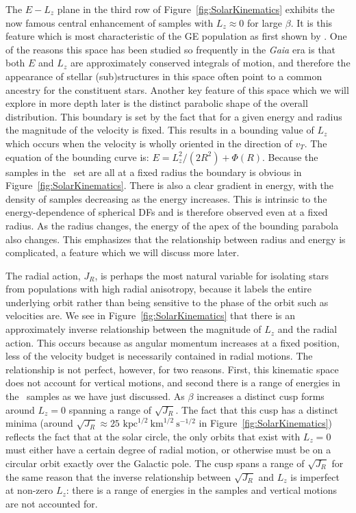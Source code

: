 The $E-L_{z}$ plane in the third row of Figure~\ref{fig:SolarKinematics} exhibits the now famous central enhancement of samples with $L_{z} \approx 0$ for large $\beta$. It is this feature which is most characteristic of the GE population as first shown by \citet{helmi18}. One of the reasons this space has been studied so frequently in the \textit{Gaia} era is that both $E$ and $L_{z}$ are approximately conserved integrals of motion, and therefore the appearance of stellar (sub)structures in this space often point to a common ancestry for the constituent stars. Another key feature of this space which we will explore in more depth later is the distinct parabolic shape of the overall distribution. This boundary is set by the fact that for a given energy and radius the magnitude of the velocity is fixed. This results in a bounding value of $L_{z}$ which occurs when the velocity is wholly oriented in the direction of $v_{T}$. The equation of the bounding curve is: $E = L_{z}^{2}/(2R^{2}) + \Phi(R)$. Because the samples in the \solar\ set are all at a fixed radius the boundary is obvious in Figure~\ref{fig:SolarKinematics}. There is also a clear gradient in energy, with the density of samples decreasing as the energy increases. This is intrinsic to the energy-dependence of spherical DFs \citep[see chapter 4.3 in ][]{binney08} and is therefore observed even at a fixed radius. As the radius changes, the energy of the apex of the bounding parabola also changes. This emphasizes that the relationship between radius and energy is complicated, a feature which we will discuss more later.

The radial action, $J_{R}$, is perhaps the most natural variable for isolating stars from populations with high radial anisotropy, because it labels the entire underlying orbit rather than being sensitive to the phase of the orbit such as velocities are. We see in Figure~\ref{fig:SolarKinematics} that there is an approximately inverse relationship between the magnitude of $L_{z}$ and the radial action. This occurs because as angular momentum increases at a fixed position, less of the velocity budget is necessarily contained in radial motions. The relationship is not perfect, however, for two reasons. First, this kinematic space does not account for vertical motions, and second there is a range of energies in the \solar\ samples as we have just discussed. As $\beta$ increases a distinct cusp forms around $L_{z}=0$ spanning a range of $\sqrt{J_{R}}$. The fact that this cusp has a distinct minima (around $\sqrt{J_{R}}\approx25$ $\mathrm{kpc}^{1/2}~\mathrm{km}^{1/2}~\mathrm{s}^{-1/2}$ in Figure~\ref{fig:SolarKinematics}) reflects the fact that at the solar circle, the only orbits that exist with $L_{z}=0$ must either have a certain degree of radial motion, or otherwise must be on a circular orbit exactly over the Galactic pole. The cusp spans a range of $\sqrt{J_{R}}$ for the same reason that the inverse relationship between $\sqrt{J_{R}}$ and $L_{z}$ is imperfect at non-zero $L_{z}$: there is a range of energies in the samples and vertical motions are not accounted for.

